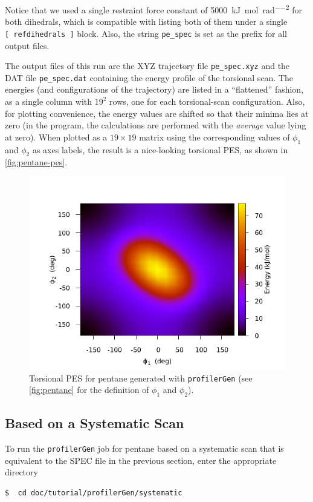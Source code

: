 \documentclass[10pt,a4paper,openany]{memoir}
\numberwithin{equation}{section}
\newcommand{\profilergen}[0]{\texttt{profilerGen}}
\begin{document}
\noindent
Notice that we used a single restraint force constant of
\SI{5000}{\kJ\per\mole\per\radian\squared} for both dihedrals, which
is compatible with listing both of them under a single
\texttt{[~refdihedrals~]} block. Also, the string \texttt{pe\_spec} is
set as the prefix for all output files.

The output files of this run are the XYZ trajectory file
\texttt{pe\_spec.xyz} and the DAT file \texttt{pe\_spec.dat}
containing the energy profile of the torsional scan. The energies (and
configurations of the trajectory) are listed in a ``flattened''
fashion, as a single column with $19^2$ rows, one for each
torsional-scan configuration. Also, for plotting convenience, the
energy values are shifted so that their minima lies at zero (in the
program, the calculations are performed with the \textit{average}
value lying at zero).  When plotted as a $19\times 19$ matrix using
the corresponding values of $\phi_1$ and $\phi_2$ as axes labels, the
result is a nice-looking torsional PES, as shown in
\autoref{fig:pentane-pes}.

\begin{figure}[tb]
  \centering
  \includegraphics[width=.6\textwidth]{pe_spec}
  \caption{Torsional PES for pentane generated with \profilergen{}
    (see \autoref{fig:pentane} for the definition of $\phi_1$ and
    $\phi_2$).}
  \label{fig:pentane-pes}
\end{figure}

\subsection{Based on a Systematic Scan}
\label{sec:tutorial-profilergen-scan}

To run the \profilergen{} job for pentane based on a systematic scan
that is equivalent to the SPEC file in the previous section, enter the
appropriate directory

\begin{lstlisting}[language=bash]
$  cd doc/tutorial/profilerGen/systematic
\end{lstlisting}\vspace{2ex}\par
\end{document}
